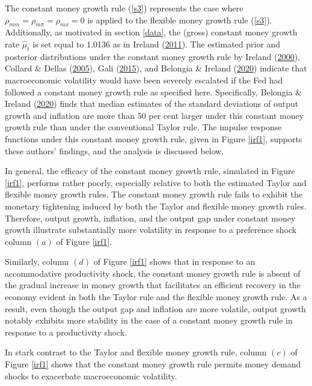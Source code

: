 \documentclass[11pt,preprint, authoryear]{elsarticle}
\numberwithin{equation}{section}
\numberwithin{figure}{section}
\numberwithin{table}{section}
\begin{document}
The constant money growth rule (\ref{s3}) represents the case where
\(\rho_{mm} = \rho_{m \pi}= \rho_{mx}=0\) is applied to the flexible
money growth rule (\ref{s3}). Additionally, as motivated in section
\ref{data}, the (gross) constant money growth rate \(\hat{\mu}_t\) is
set equal to 1.0136 as in Ireland
(\protect\hyperlink{ref-ireland2011}{2011}). The estimated prior and
posterior distributions under the constant money growth rule by Ireland
(\protect\hyperlink{ref-ireland2000}{2000}), Collard \& Dellas
(\protect\hyperlink{ref-collard2005}{2005}), Gali
(\protect\hyperlink{ref-gali2015}{2015}), and Belongia \& Ireland
(\protect\hyperlink{ref-belongia2020}{2020}) indicate that macroeconomic
volatility would have been severely escalated if the Fed had followed a
constant money growth rule as specified here. Specifically, Belongia \&
Ireland (\protect\hyperlink{ref-belongia2020}{2020}) finds that median
estimates of the standard deviations of output growth and inflation are
more than \(50\) per cent larger under this constant money growth rule
than under the conventional Taylor rule. The impulse response functions
under this constant money growth rule, given in Figure \ref{irf1},
supports these authors' findings, and the analysis is discussed below.

In general, the efficacy of the constant money growth rule, simulated in
Figure \ref{irf1}, performs rather poorly, especially relative to both
the estimated Taylor and flexible money growth rules. The constant money
growth rule fails to exhibit the monetary tightening induced by both the
Taylor and flexible money growth rules. Therefore, output growth,
inflation, and the output gap under constant money growth illustrate
substantially more volatility in response to a preference shock column
\((a)\) of Figure \ref{irf1}.

Similarly, column \((d)\) of Figure \ref{irf1} shows that in response to
an accommodative productivity shock, the constant money growth rule is
absent of the gradual increase in money growth that facilitates an
efficient recovery in the economy evident in both the Taylor rule and
the flexible money growth rule. As a result, even though the output gap
and inflation are more volatile, output growth notably exhibits more
stability in the case of a constant money growth rule in response to a
productivity shock.

In stark contrast to the Taylor and flexible money growth rule, column
\((c)\) of Figure \ref{irf1} shows that the constant money growth rule
permits money demand shocks to exacerbate macroeconomic volatility.
\end{document}
